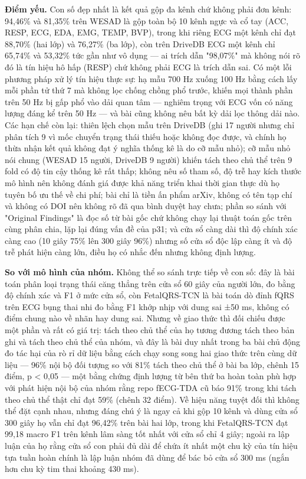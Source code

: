 \documentclass[12pt,a4paper]{article}
\begin{document}
\noindent \textbf{Điểm yếu.} Con số đẹp nhất là kết quả gộp đa kênh chứ không phải đơn kênh: 94,46\% và 81,35\% trên WESAD là gộp toàn bộ 10 kênh ngực và cổ tay (ACC, RESP, ECG, EDA, EMG, TEMP, BVP), trong khi riêng ECG một kênh chỉ đạt 88,70\% (hai lớp) và 76,27\% (ba lớp), còn trên DriveDB ECG một kênh chỉ 65,74\% và 53,32\% tức gần như vô dụng — ai trích dẫn "98,07\%" mà không nói rõ đó là tín hiệu hô hấp (RESP) chứ không phải ECG là trích dẫn sai. Có một lỗi phương pháp xử lý tín hiệu thực sự: hạ mẫu 700 Hz xuống 100 Hz bằng cách lấy mỗi phần tử thứ 7 mà không lọc chống chồng phổ trước, khiến mọi thành phần trên 50 Hz bị gấp phổ vào dải quan tâm — nghiêm trọng với ECG vốn có năng lượng đáng kể trên 50 Hz — và bài cũng không nêu bất kỳ dải lọc thông dải nào. Các hạn chế còn lại: thiên lệch chọn mẫu trên DriveDB (ghi 17 người nhưng chỉ phân tích 9 vì mốc chuyển trạng thái thiếu hoặc không đọc được, và chính họ thừa nhận kết quả không đạt ý nghĩa thống kê là do cỡ mẫu nhỏ); cỡ mẫu nhỏ nói chung (WESAD 15 người, DriveDB 9 người) khiến tách theo chủ thể trên 9 fold có độ tin cậy thống kê rất thấp; không nêu số tham số, độ trễ hay kích thước mô hình nên không đánh giá được khả năng triển khai thời gian thực dù họ tuyên bố ưu thế về chi phí; bài chỉ là tiền ấn phẩm arXiv, không có tên tạp chí và không có DOI nên không rõ đã qua bình duyệt hay chưa; phần so sánh với "Original Findings" là đọc số từ bài gốc chứ không chạy lại thuật toán gốc trên cùng phân chia, lặp lại đúng vấn đề của p31; và cửa sổ càng dài thì độ chính xác càng cao (10 giây 75\% lên 300 giây 96\%) nhưng số cửa sổ độc lập càng ít và độ trễ phát hiện càng lớn, điều họ có nhắc đến nhưng không định lượng.\par\vspace{3pt}
\noindent \textbf{\color{tdtblue}So với mô hình của nhóm.} Không thể so sánh trực tiếp về con số: đây là bài toán phân loại trạng thái căng thẳng trên cửa sổ 60 giây của người lớn, đo bằng độ chính xác và F1 ở mức cửa sổ, còn FetalQRS-TCN là bài toán dò đỉnh fQRS trên ECG bụng thai nhi đo bằng F1 khớp nhịp với dung sai ±50 ms, không có điểm chung nào về nhãn hay dung sai. Nhưng về giao thức thì đối chiếu được một phần và rất có giá trị: tách theo chủ thể của họ tương đương tách theo bản ghi và tách theo chủ thể của nhóm, và đây là bài duy nhất trong ba bài chủ động đo tác hại của rò rỉ dữ liệu bằng cách chạy song song hai giao thức trên cùng dữ liệu — 96\% nội bộ đối tượng so với 81\% tách theo chủ thể ở bài ba lớp, chênh 15 điểm, p < 0,05 — một bằng chứng định lượng từ bên thứ ba hoàn toàn phù hợp với phát hiện nội bộ của nhóm rằng repo fECG-TDA cũ báo 91\% trong khi tách theo chủ thể thật chỉ đạt 59\% (chênh 32 điểm). Về hiệu năng tuyệt đối thì không thể đặt cạnh nhau, nhưng đáng chú ý là ngay cả khi gộp 10 kênh và dùng cửa sổ 300 giây họ vẫn chỉ đạt 96,42\% trên bài hai lớp, trong khi FetalQRS-TCN đạt 99,18 macro F1 trên kênh lâm sàng tốt nhất với cửa sổ chỉ 4 giây; ngoài ra lập luận của họ rằng cửa sổ con phải đủ dài để chứa ít nhất một chu kỳ của tín hiệu tựa tuần hoàn chính là lập luận nhóm đã dùng để bác bỏ cửa sổ 300 ms (ngắn hơn chu kỳ tim thai khoảng 430 ms).\par\vspace{3pt}
\end{document}
